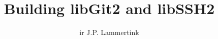 \newcommand*{\BOOKCLASS}{}


\title{Building libGit2 and libSSH2}
\author{ir J.P. Lammertink}
\maketitle
\tableofcontents



